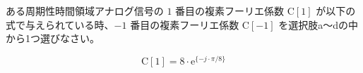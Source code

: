 ある周期性時間領域アナログ信号の $1$ 番目の複素フーリエ係数 $\textrm{C}[1]$ が以下の式で与えられている時、$-1$ 番目の複素フーリエ係数 $\textrm{C}[-1]$ を選択肢a〜dの中から1つ選びなさい。

\[
\textrm{C}[1] = 8 \cdot \textrm{e}^{\{ -j \cdot \pi/8 \}}
\]

